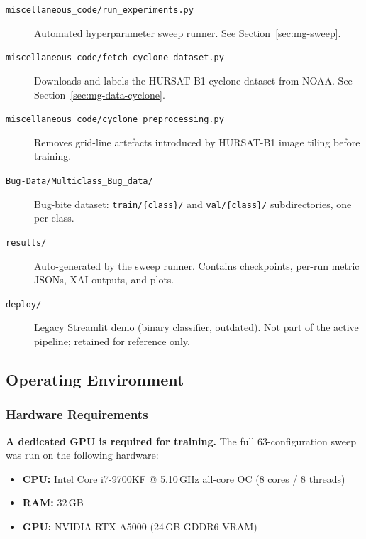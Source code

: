 \documentclass[12pt,a4paper]{article}
\begin{document}
\begin{description}
    \item[\texttt{miscellaneous\_code/run\_experiments.py}]
          Automated hyperparameter sweep runner.
          See Section~\ref{sec:mg-sweep}.

    \item[\texttt{miscellaneous\_code/fetch\_cyclone\_dataset.py}]
          Downloads and labels the HURSAT-B1 cyclone dataset from NOAA.
          See Section~\ref{sec:mg-data-cyclone}.

    \item[\texttt{miscellaneous\_code/cyclone\_preprocessing.py}]
          Removes grid-line artefacts introduced by HURSAT-B1 image tiling
          before training.

    \item[\texttt{Bug-Data/Multiclass\_Bug\_data/}]
          Bug-bite dataset: \texttt{train/\{class\}/} and
          \texttt{val/\{class\}/} subdirectories, one per class.

    \item[\texttt{results/}]
          Auto-generated by the sweep runner. Contains checkpoints,
          per-run metric JSONs, XAI outputs, and plots.

    \item[\texttt{deploy/}]
          Legacy Streamlit demo (binary classifier, outdated). Not part
          of the active pipeline; retained for reference only.
\end{description}

\subsection{Operating Environment}
\label{sec:mg-env}

\subsubsection{Hardware Requirements}

\textbf{A dedicated GPU is required for training.} The full 63-configuration
sweep was run on the following hardware:

\begin{itemize}
    \item \textbf{CPU:} Intel Core i7-9700KF @ 5.10\,GHz all-core OC
          (8 cores / 8 threads)
    \item \textbf{RAM:} 32\,GB
    \item \textbf{GPU:} NVIDIA RTX A5000 (24\,GB GDDR6 VRAM)
\end{itemize}
\end{document}
